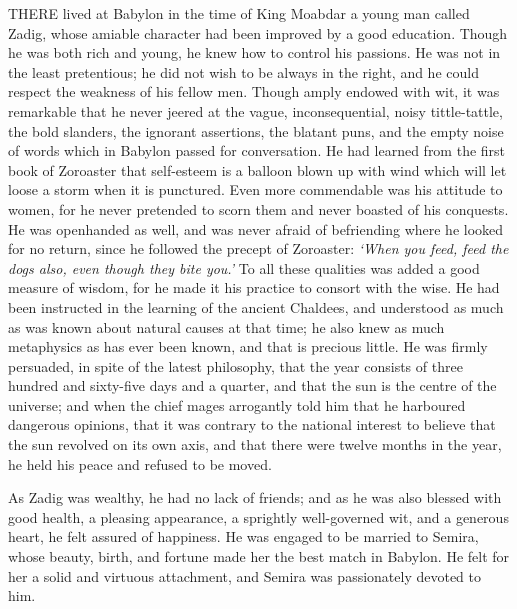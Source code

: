 \documentclass{article}
\begin{document}
\begin{center}
\baselineskip=12pt
\leftskip=0pt
THERE lived at Babylon in the time of King Moabdar a young man called Zadig, whose 
amiable character had been improved by a good education. Though he was both rich 
and young, he knew how to control his passions. He was not in the least pretentious; 
he did not wish to be always in the right, and he could respect the weakness of 
his fellow men. Though amply endowed with wit, it was remarkable that he never 
jeered at the vague, inconsequential, noisy tittle-tattle, the bold slanders, the 
ignorant assertions, the blatant puns, and the empty noise of words which in Babylon 
passed for conversation. He had learned from the first book of Zoroaster that self-esteem 
is a balloon blown up with wind which will let loose a storm when it is punctured. 
Even more commendable was his attitude to women, for he never pretended to scorn 
them and never boasted of his conquests. He was openhanded as well, and was never 
afraid of befriending where he looked for no return, since he followed the precept 
of Zoroaster: \textit{`When you feed, feed the dogs also, even though they bite 
you.'} To all these qualities was added a good measure of wisdom, for he made it 
his practice to consort with the wise. He had been instructed in the learning of 
the ancient Chaldees, and understood as much as was known about natural causes 
at that time; he also knew as much metaphysics as has ever been known, and that 
is precious little. He was firmly persuaded, in spite of the latest philosophy, 
that the year consists of three hundred and sixty-five days and a quarter, and 
that the sun is the centre of the universe; and when the chief mages arrogantly 
told him that he harboured dangerous opinions, that it was contrary to the national 
interest to believe that the sun revolved on its own axis, and that there were 
twelve months in the year, he held his peace and refused to be moved. 

As Zadig was wealthy, he had no lack of friends; and as he was also blessed with 
good health, a pleasing appearance, a sprightly well-governed wit, and a generous 
heart, he felt assured of happiness. He was engaged to be married to Semira, whose 
beauty, birth, and fortune made her the best match in Babylon. He felt for her 
a solid and virtuous attachment, and Semira was passionately devoted to him. 


\end{center}
\end{document}
